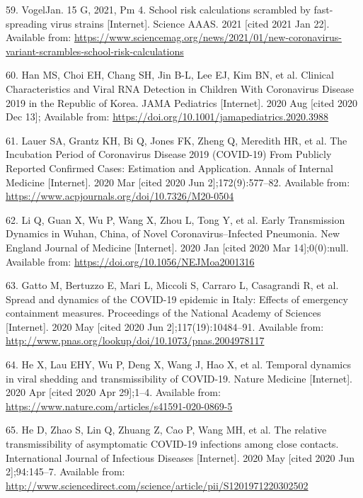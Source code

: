 \documentclass[
]{article}
\begin{document}
\leavevmode\hypertarget{ref-vogeljan_15_school_2021}{}%
59. VogelJan. 15 G, 2021, Pm 4. School risk calculations scrambled by
fast-spreading virus strains {[}Internet{]}. Science AAAS. 2021 {[}cited
2021 Jan 22{]}. Available from:
\url{https://www.sciencemag.org/news/2021/01/new-coronavirus-variant-scrambles-school-risk-calculations}

\leavevmode\hypertarget{ref-han_clinical_2020}{}%
60. Han MS, Choi EH, Chang SH, Jin B-L, Lee EJ, Kim BN, et al. Clinical
Characteristics and Viral RNA Detection in Children With Coronavirus
Disease 2019 in the Republic of Korea. JAMA Pediatrics {[}Internet{]}.
2020 Aug {[}cited 2020 Dec 13{]}; Available from:
\url{https://doi.org/10.1001/jamapediatrics.2020.3988}

\leavevmode\hypertarget{ref-lauer_incubation_2020}{}%
61. Lauer SA, Grantz KH, Bi Q, Jones FK, Zheng Q, Meredith HR, et al.
The Incubation Period of Coronavirus Disease 2019 (COVID-19) From
Publicly Reported Confirmed Cases: Estimation and Application. Annals of
Internal Medicine {[}Internet{]}. 2020 Mar {[}cited 2020 Jun
2{]};172(9):577--82. Available from:
\url{https://www.acpjournals.org/doi/10.7326/M20-0504}

\leavevmode\hypertarget{ref-li_early_2020}{}%
62. Li Q, Guan X, Wu P, Wang X, Zhou L, Tong Y, et al. Early
Transmission Dynamics in Wuhan, China, of Novel Coronavirus--Infected
Pneumonia. New England Journal of Medicine {[}Internet{]}. 2020 Jan
{[}cited 2020 Mar 14{]};0(0):null. Available from:
\url{https://doi.org/10.1056/NEJMoa2001316}

\leavevmode\hypertarget{ref-gatto_spread_2020}{}%
63. Gatto M, Bertuzzo E, Mari L, Miccoli S, Carraro L, Casagrandi R, et
al. Spread and dynamics of the COVID-19 epidemic in Italy: Effects of
emergency containment measures. Proceedings of the National Academy of
Sciences {[}Internet{]}. 2020 May {[}cited 2020 Jun
2{]};117(19):10484--91. Available from:
\url{http://www.pnas.org/lookup/doi/10.1073/pnas.2004978117}

\leavevmode\hypertarget{ref-he_temporal_2020}{}%
64. He X, Lau EHY, Wu P, Deng X, Wang J, Hao X, et al. Temporal dynamics
in viral shedding and transmissibility of COVID-19. Nature Medicine
{[}Internet{]}. 2020 Apr {[}cited 2020 Apr 29{]};1--4. Available from:
\url{https://www.nature.com/articles/s41591-020-0869-5}

\leavevmode\hypertarget{ref-he_relative_2020}{}%
65. He D, Zhao S, Lin Q, Zhuang Z, Cao P, Wang MH, et al. The relative
transmissibility of asymptomatic COVID-19 infections among close
contacts. International Journal of Infectious Diseases {[}Internet{]}.
2020 May {[}cited 2020 Jun 2{]};94:145--7. Available from:
\url{http://www.sciencedirect.com/science/article/pii/S1201971220302502}
\end{document}
